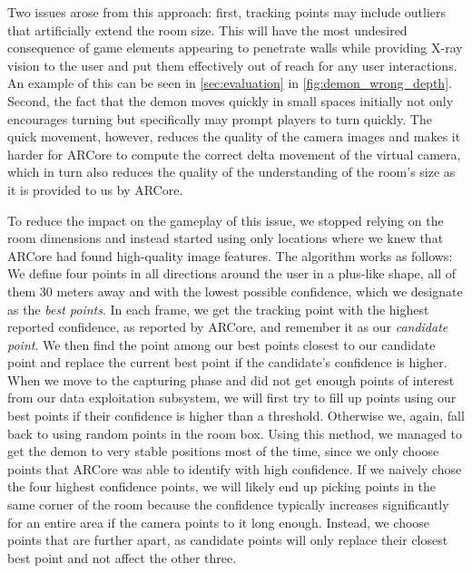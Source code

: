 Two issues arose from this approach: first, tracking points may include outliers that artificially extend the room size.
This will have the most undesired consequence of game elements appearing to penetrate walls while providing X-ray vision to the user and put them effectively out of reach for any user interactions. An example of this can be seen in \autoref{sec:evaluation} in  \autoref{fig:demon_wrong_depth}.
Second, the fact that the demon moves quickly in small spaces initially not only encourages turning but specifically may prompt players to turn quickly.
The quick movement, however, reduces the quality of the camera images and makes it harder for ARCore to compute the correct delta movement of the virtual camera, which in turn also reduces the quality of the understanding of the room's size as it is provided to us by ARCore.

To reduce the impact on the gameplay of this issue, we stopped relying on the room dimensions and instead started using only locations where we knew that ARCore had found high-quality image features.
The algorithm works as follows: We define four points in all directions around the user in a plus-like shape, all of them 30 meters away and with the lowest possible confidence, which we designate as the \emph{best points}.
In each frame, we get the tracking point with the highest reported confidence, as reported by ARCore, and remember it as our \emph{candidate point}.
We then find the point among our best points closest to our candidate point and replace the current best point if the candidate's confidence is higher.
When we move to the capturing phase and did not get enough points of interest from our data exploitation subsystem, we will first try to fill up points using our best points if their confidence is higher than a threshold.
Otherwise we, again, fall back to using random points in the room box.
Using this method, we managed to get the demon to very stable positions most of the time, since we only choose points that ARCore was able to identify with high confidence.
If we naively chose the four highest confidence points, we will likely end up picking points in the same corner of the room because the confidence typically increases significantly for an entire area if the camera points to it long enough.
Instead, we choose points that are further apart, as candidate points will only replace their closest best point and not affect the other three.

